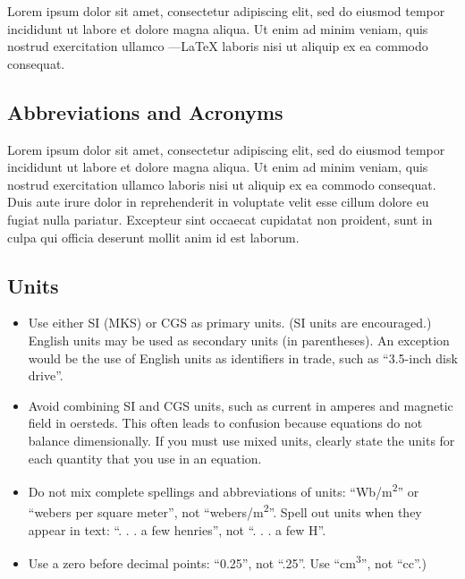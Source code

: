 \documentclass[conference]{IEEEtran}
\begin{document}
    Lorem ipsum dolor sit amet, consectetur adipiscing elit, sed do eiusmod 
    tempor incididunt ut labore et dolore magna aliqua. Ut enim ad minim 
    veniam, quis nostrud exercitation ullamco ---{\LaTeX} laboris nisi ut 
    aliquip ex ea commodo consequat.

\subsection{Abbreviations and Acronyms}\label{AA}
    Lorem ipsum dolor sit amet, consectetur adipiscing elit, sed do eiusmod 
    tempor incididunt ut labore et dolore magna aliqua. Ut enim ad minim 
    veniam, quis nostrud exercitation ullamco laboris nisi ut aliquip ex ea 
    commodo consequat. Duis aute irure dolor in reprehenderit in voluptate 
    velit esse cillum dolore eu fugiat nulla pariatur. Excepteur sint occaecat 
    cupidatat non proident, sunt in culpa qui officia deserunt mollit anim id 
    est laborum.

\subsection{Units}
\begin{itemize}
    \item Use either SI (MKS) or CGS as primary units. (SI units are 
    encouraged.) English units may be used as secondary units (in parentheses). 
    An exception would be the use of English units as identifiers in trade, 
    such as ``3.5-inch disk drive''.
    \item Avoid combining SI and CGS units, such as current in amperes and 
    magnetic field in oersteds. This often leads to confusion because 
    equations do not balance dimensionally. If you must use mixed units, 
    clearly state the units for each quantity that you use in an equation.
    \item Do not mix complete spellings and abbreviations of units: 
    ``Wb/m\textsuperscript{2}'' or ``webers per square meter'', not 
    ``webers/m\textsuperscript{2}''. Spell out units when they appear in 
    text: ``. . . a few henries'', not ``. . . a few H''.
    \item Use a zero before decimal points: ``0.25'', not ``.25''. Use 
    ``cm\textsuperscript{3}'', not ``cc''.)
\end{itemize}
\end{document}
